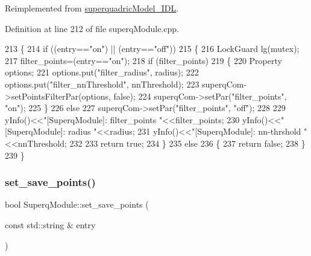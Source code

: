 Reimplemented from \mbox{\hyperlink{classsuperquadricModel__IDL_a1a2080d797a81b46b0dffa86b5367e15}{superquadric\+Model\+\_\+\+I\+DL}}.



Definition at line 212 of file superq\+Module.\+cpp.


\begin{DoxyCode}
213 \{
214     \textcolor{keywordflow}{if} ((entry==\textcolor{stringliteral}{"on"}) || (entry==\textcolor{stringliteral}{"off"}))
215     \{
216         LockGuard lg(mutex);
217         filter_points=(entry==\textcolor{stringliteral}{"on"});
218         \textcolor{keywordflow}{if} (filter_points)
219         \{
220             Property options;
221             options.put(\textcolor{stringliteral}{"filter\_radius"}, radius);
222             options.put(\textcolor{stringliteral}{"filter\_nnThreshold"}, nnThreshold);
223             superqCom->setPointsFilterPar(options, \textcolor{keyword}{false});
224             superqCom->setPar(\textcolor{stringliteral}{"filter\_points"}, \textcolor{stringliteral}{"on"});
225         \}
226         \textcolor{keywordflow}{else}
227             superqCom->setPar(\textcolor{stringliteral}{"filter\_points"}, \textcolor{stringliteral}{"off"});
228 
229         yInfo()<<\textcolor{stringliteral}{"[SuperqModule]: filter\_points "}<<filter_points;
230         yInfo()<<\textcolor{stringliteral}{"[SuperqModule]: radius        "}<<radius;
231         yInfo()<<\textcolor{stringliteral}{"[SuperqModule]: nn-thrshold   "}<<nnThreshold;
232 
233         \textcolor{keywordflow}{return} \textcolor{keyword}{true};    
234     \}
235     \textcolor{keywordflow}{else}
236     \{        
237         \textcolor{keywordflow}{return} \textcolor{keyword}{false};
238     \}
239 \}
\end{DoxyCode}
\mbox{\label{classSuperqModule_a90826fc53859ecf126f22a2569611b2c}} 
\subsubsection{\texorpdfstring{set\+\_\+save\+\_\+points()}{set\_save\_points()}}
{\footnotesize\ttfamily bool Superq\+Module\+::set\+\_\+save\+\_\+points (\begin{DoxyParamCaption}\item[{const std\+::string \&}]{entry }\end{DoxyParamCaption})\hspace{0.3cm}{\ttfamily [virtual]}}



